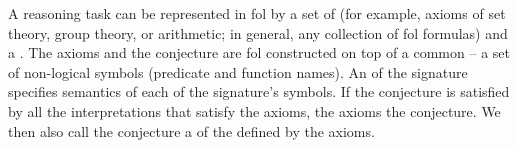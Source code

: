 
A reasoning task can be represented in \gls{fol} by a set of  (for example, axioms of set theory, group theory, or arithmetic; in general, any collection of \gls{fol} formulas) and a .
The axioms and the conjecture are \gls{fol}  constructed on top of a common  -- a set of non-logical symbols (predicate and function names).
An  of the signature specifies semantics of each of the signature's symbols.
If the conjecture is satisfied by all the interpretations that satisfy the axioms,
the axioms  the conjecture.
We then also call the conjecture a  of the  defined by the axioms.


